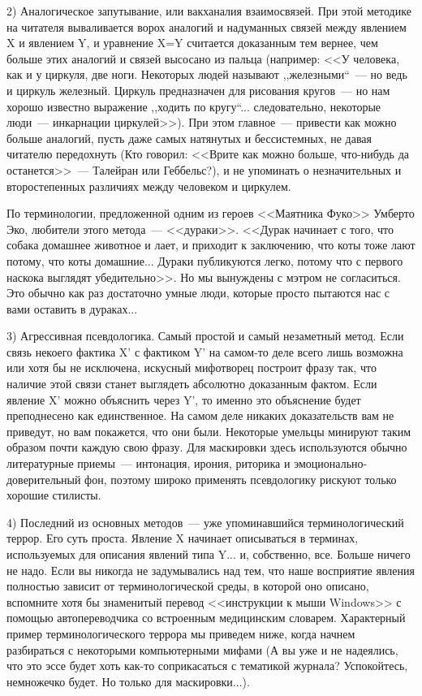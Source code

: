 \documentclass{scrbook}
\newcommand{\glqq}{,,}
\newcommand{\grqq}{``}
\newcommand{\flqq}{<<}
\newcommand{\frqq}{>>}
\newcommand{\mdash}{~--- }
\begin{document}
2) Аналогическое запутывание, или вакханалия взаимосвязей. При этой методике на читателя вываливается ворох аналогий и надуманных связей между явлением X и явлением Y, и уравнение X=Y считается доказанным тем вернее, чем больше этих аналогий и связей высосано из пальца (например: {\flqq}У человека, как и у циркуля, две ноги. Некоторых людей называют {\glqq}железными{\grqq}{\mdash}но ведь и циркуль железный. Циркуль предназначен для рисования кругов{\mdash}но нам хорошо известно выражение {\glqq}ходить по кругу{\grqq}... следовательно, некоторые люди{\mdash}инкарнации циркулей{\frqq}). При этом главное{\mdash}привести как можно больше аналогий, пусть даже самых натянутых и бессистемных, не давая читателю передохнуть (Кто говорил: {\flqq}Врите как можно больше, что-нибудь да останется{\frqq}{\mdash}Талейран или Геббельс?), и не упоминать о незначительных и второстепенных различиях между человеком и циркулем.

По терминологии, предложенной одним из героев {\flqq}Маятника Фуко{\frqq} Умберто Эко, любители этого метода{\mdash}{\flqq}дураки{\frqq}. {\flqq}Дурак начинает с того, что собака домашнее животное и лает, и приходит к заключению, что коты тоже лают потому, что коты домашние... Дураки публикуются легко, потому что с первого наскока выглядят убедительно{\frqq}. Но мы вынуждены с мэтром не согласиться. Это обычно как раз достаточно умные люди, которые просто пытаются нас с вами оставить в дураках...

3) Агрессивная псевдологика. Самый простой и самый незаметный метод. Если связь некоего фактика X' с фактиком Y' на самом-то деле всего лишь возможна или хотя бы не исключена, искусный мифотворец построит фразу так, что наличие этой связи станет выглядеть абсолютно доказанным фактом. Если явление X' можно объяснить через Y', то именно это объяснение будет преподнесено как единственное. На самом деле никаких доказательств вам не приведут, но вам покажется, что они были. Некоторые умельцы минируют таким образом почти каждую свою фразу. Для маскировки здесь используются обычно литературные приемы{\mdash}интонация, ирония, риторика и эмоционально-доверительный фон, поэтому широко применять псевдологику рискуют только хорошие стилисты.

4) Последний из основных методов{\mdash}уже упоминавшийся терминологический террор. Его суть проста. Явление X начинает описываться в терминах, используемых для описания явлений типа Y... и, собственно, все. Больше ничего не надо. Если вы никогда не задумывались над тем, что наше восприятие явления полностью зависит от терминологической среды, в которой оно описано, вспомните хотя бы знаменитый перевод {\flqq}инструкции к мыши Windows{\frqq} с помощью автопереводчика со встроенным медицинским словарем. Характерный пример терминологического террора мы приведем ниже, когда начнем разбираться с некоторыми компьютерными мифами (А вы уже и не надеялись, что это эссе будет хоть как-то соприкасаться с тематикой журнала? Успокойтесь, немножечко будет. Но только для маскировки...).
\end{document}
